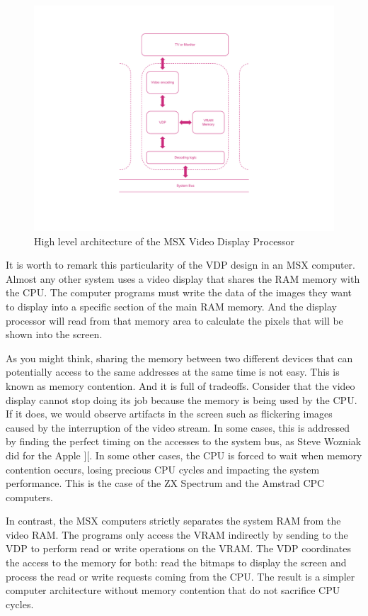 \begin{figure}
	\centering
	\includegraphics[width=1\linewidth,trim={2cm 80 2 0},clip]{images/figures/msx-arch-vdp}
	\caption{High level architecture of the MSX Video Display Processor}
	\label{fig:msx-arch-vdp}
\end{figure}

It is worth to remark this particularity of the VDP design in an MSX computer. Almost any other system uses a video display that shares the RAM memory with the CPU. The computer programs must write the data of the images they want to display into a specific section of the main RAM memory. And the display processor will read from that memory area to calculate the pixels that will be shown into the screen. 

As you might think, sharing the memory between two different devices that can potentially access to the same addresses at the same time is not easy. This is known as memory contention. And it is full of tradeoffs. Consider that the video display cannot stop doing its job because the memory is being used by the CPU. If it does, we would observe artifacts in the screen such as flickering images caused by the interruption of the video stream. In some cases, this is addressed by finding the perfect timing on the accesses to the system bus, as Steve Wozniak did for the Apple ][. In some other cases, the CPU is forced to wait when memory contention occurs, losing precious CPU cycles and impacting the system performance. This is the case of the ZX Spectrum and the Amstrad CPC computers. 

In contrast, the MSX computers strictly separates the system RAM from the video RAM. The programs only access the VRAM indirectly by sending  to the VDP to perform read or write operations on the VRAM. The VDP coordinates the access to the memory for both: read the bitmaps to display the screen and process the read or write requests coming from the CPU. The result is a simpler computer architecture without memory contention that do not sacrifice CPU cycles. 


